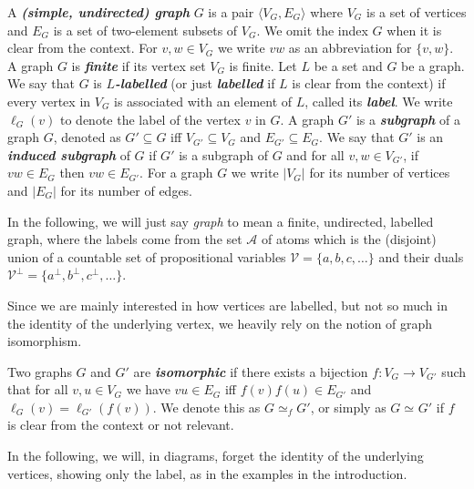\documentclass{lmcs} %
\newcommand{\isom}[1][]{\simeq_{#1}}
\def\defn#1{\emph{\bfseries\boldmath #1}}
\def\set#1{\{#1\}}
\def\tuple#1{\langle#1\rangle}
\def\cneg#1{{#1^\bot}}
\def\gG{G}
\newcommand{\vertices}[1][]{V_{#1}}
\newcommand{\gEdges}[1][]{E_{#1}}
\newcommand{\vG}{\vertices[G]}
\newcommand{\eG}{\gEdges[G]}
\newcommand{\vGp}{\vertices[G']}
\newcommand{\eGp}{\gEdges[G']}
\newcommand{\cA}{\mathcal{A}}
\newcommand{\cV}{\mathcal{V}}
\newcommand{\sizeof}[1]{|#1|}
\newcommand{\labelof}[2][]{\ell_{#1}(#2)}
\theoremstyle{plain}
\begin{document}
\begin{defi}\label{def:graph}
  A \defn{(simple, undirected) graph} $\gG$ is a pair
  $\tuple{\vG,\eG}$ where $\vG$ is a set of vertices and $\eG$ is a
  set of two-element subsets of $\vG$. We omit the index $\gG$ when it
  is clear from the context. For $v,w\in\vG$ we write $vw$ as an abbreviation
  for $\set{v,w}$. A graph $G$ is \defn{finite} if its vertex set
  $\vG$ is finite. Let $L$ be a set and $\gG$ be a graph. We say that
  $\gG$ is \defn{$L$-labelled} (or just \defn{labelled} if
  $L$ is clear from the context) if every vertex in $\vG$ is associated
  with an element of $L$, called its \defn{label}. We write
  $\labelof[\gG]{v}$ to denote the label of the vertex $v$ in $\gG$. A
  graph $\gG'$ is a \defn{subgraph} of a graph $\gG$, denoted as
  $\gG'\subseteq\gG$ iff $\vGp\subseteq\vG$ and $\eGp\subseteq\eG$. We
  say that $\gG'$ is an \defn{induced subgraph} of $\gG$ if $\gG'$ is
  a subgraph of $\gG$ and for all $v,w\in\vGp$, if $vw\in\eG$ then
  $vw\in\eGp$. For a graph $G$ we write $\sizeof{\vG}$ for its number of vertices and $\sizeof{\eG}$ for its number of edges.
\end{defi}



In the following, we will just say \emph{graph} to mean a finite,
undirected, labelled graph, where the labels come from the set $\cA$
of atoms which is the (disjoint) union of a countable set of
propositional variables $\cV=\set{a,b,c,\ldots}$ and their duals
$\cneg\cV=\set{\cneg a,\cneg b,\cneg c,\ldots}$.

Since we are mainly interested in how vertices are labelled, but not so much in the identity of the underlying vertex,
we heavily rely on the notion of graph isomorphism.


\begin{defi}\label{def:iso}
  Two graphs $\gG$ and $\gG'$ are \defn{isomorphic} if there exists a
  bijection $f \colon \vG \rightarrow \vGp$ such that for all
  $v,u\in\vG$ we have $vu \in \eG$ iff $f(v)f(u) \in \eGp$ and
  $\labelof[\gG]{v}=\labelof[\gG']{f(v)}$. We denote this as
  $G\isom[f]G'$, or simply as $G\isom G'$ if $f$ is clear from the context
  or not relevant.
\end{defi}


In the following, we will, in diagrams, forget the identity of the
underlying vertices, showing only the label, as in the examples in the
introduction.
\end{document}
